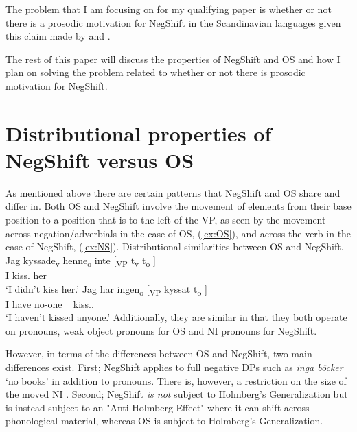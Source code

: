 \documentclass[12pt, letterpaper]{article}
\begin{document}
The problem that I am focusing on for my qualifying paper is whether or not there is a prosodic motivation for NegShift in the Scandinavian languages given this claim made by \citet{christensenInterfacesNegationSyntax2005} and \citet{penkaNegativeIndefinites2011}. 

The rest of this paper will discuss the properties of NegShift and OS and how I plan on solving the problem related to whether or not there is prosodic motivation for NegShift. 

\section{Distributional properties of NegShift versus OS} \label{sec:DISTRIBUTION}

As mentioned above there are certain patterns that NegShift and OS share and differ in. Both OS and NegShift involve the movement of elements from their base position to a position that is to the left of the VP, as seen by the movement across negation/adverbials in the case of OS, (\ref{ex:OS}), and across the verb in the case of NegShift, (\ref{ex:NS}).
	\ea Distributional similarities between OS and NegShift.
		\ea 
		\gll Jag kyssade\textsubscript{v} henne\textsubscript{o} inte [\textsubscript{VP} t\textsubscript{v} t\textsubscript{o} ] \\
		I kiss.\Pst{} her \Neg{}\\
		\glt `I didn't kiss her.'
		\ex \label{ex:NS}
		\gll Jag har ingen\textsubscript{o} [\textsubscript{VP} kyssat t\textsubscript{o} ]\\
		I have no-one ~ kiss.\Pst{}.\Ptcp{} \\
		\glt `I haven't kissed anyone.'
		\z 
	\z 
Additionally, they are similar in that they both operate on pronouns, weak object pronouns for OS and NI pronouns for NegShift. 

However, in terms of the differences between OS and NegShift, two main differences exist. First; NegShift applies to full negative DPs such as \textit{inga böcker} `no books' in addition to pronouns. There is, however, a restriction on the size of the moved NI \citep{christensenInterfacesNegationSyntax2005,penkaNegativeIndefinites2011}. Second; NegShift \emph{is not} subject to Holmberg's Generalization but is instead subject to an "Anti-Holmberg Effect" where it can shift across phonological material, whereas OS is subject to Holmberg's Generalization. 
\end{document}
